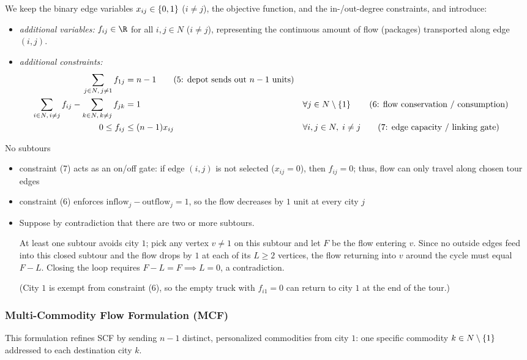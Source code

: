 \documentclass[a4paper, 11pt]{report}
\begin{document}
We keep the binary edge variables $x_{ij} \in \set{0,1}$ ($i \neq j$), the objective function, and the in-/out-degree constraints, and introduce:
\begin{itemize}
    \item \textit{additional variables:} $f_{ij} \in \R$ for all $i,j \in N$ ($i \neq j$), representing the continuous amount of flow (packages) transported along edge $(i,j)$.
    \item \textit{additional constraints:}
    \begin{align*}
        \sum_{j \in N, \, j \neq 1} f_{1j} &= n - 1 \tag{5: depot sends out $n-1$ units} \\
        \sum_{i \in N, \, i \neq j} f_{ij} - \sum_{k \in N, \, k \neq j} f_{jk} &= 1 && \forall j \in N \setminus \set{1} \tag{6: flow conservation / consumption} \\
        0 \leq f_{ij} &\leq (n - 1) x_{ij} && \forall i,j \in N, \; i \neq j \tag{7: edge capacity / linking gate}
    \end{align*}
\end{itemize}

\begin{gframe}{No subtours}
\begin{itemize}
    \item constraint (7) acts as an on/off gate: if edge $(i,j)$ is not selected ($x_{ij} = 0$), then $f_{ij} = 0$; thus, flow can only travel along chosen tour edges
    \item constraint (6) enforces $\text{inflow}_j - \text{outflow}_j = 1$, so the flow decreases by $1$ unit at every city $j$
    \item Suppose by contradiction that there are two or more subtours. 

        At least one subtour avoids city $1$; pick any vertex $v \neq 1$ on this subtour and let $F$ be the flow entering $v$. Since no outside edges feed into this closed subtour and the flow drops by $1$ at each of its $L \geq 2$ vertices, the flow returning into $v$ around the cycle must equal $F - L$. Closing the loop requires $F - L = F \implies L = 0$, a contradiction. 

        (City $1$ is exempt from constraint (6), so the empty truck with $f_{i1} = 0$ can return to city $1$ at the end of the tour.)
\end{itemize}

\end{gframe}

\subsubsection{Multi-Commodity Flow Formulation (MCF)}
This formulation refines SCF by sending $n-1$ distinct, personalized commodities from city $1$: one specific commodity $k \in N \setminus \set{1}$ addressed to each destination city $k$.
\end{document}
